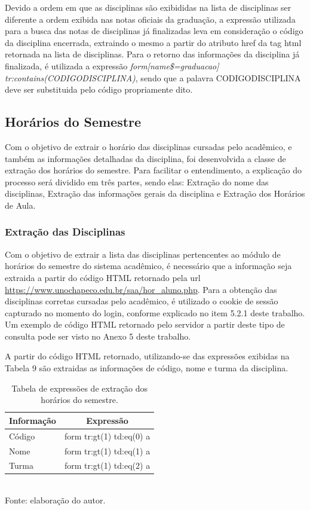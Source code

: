 Devido a ordem em que as disciplinas são exibididas na lista de disciplinas ser diferente a ordem exibida nas notas oficiais da graduação, a expressão utilizada para a busca das notas de disciplinas já finalizadas leva em consideração o código da disciplina encerrada, extraindo o mesmo a partir do atributo href da tag html retornada na lista de disciplinas. Para o retorno das informações da disciplina já finalizada, é utilizada a expressão \emph{form[name\$=graduacao] tr:contains(CODIGODISCIPLINA)}, sendo que a palavra CODIGODISCIPLINA deve ser substituida pelo código propriamente dito.

\subsection{Horários do Semestre}
Com o objetivo de extrair o horário das disciplinas cursadas pelo acadêmico, e também as informações detalhadas da disciplina, foi desenvolvida a classe de extração dos horários do semestre. Para facilitar o entendimento, a explicação do processo será dividido em três partes, sendo elas: Extração do nome das disciplinas, Extração das informações gerais da disciplina e Extração dos Horários de Aula.

\subsubsection{Extração das Disciplinas}
Com o objetivo de extrair a lista das disciplinas pertencentes ao módulo de horários do semestre do sistema acadêmico, é necessário que a informação seja extraida a partir do código HTML retornado pela url \url{https://www.unochapeco.edu.br/saa/hor_aluno.php}. Para a obtenção das disciplinas corretas cursadas pelo acadêmico, é utilizado o cookie de sessão capturado no momento do login, conforme explicado no item 5.2.1 deste trabalho. Um exemplo de código HTML retornado pelo servidor a partir deste tipo de consulta pode ser visto no Anexo 5 deste trabalho.

A partir do código HTML retornado, utilizando-se das expressões exibidas na Tabela 9 são extraidas as informações de código, nome e turma da disciplina.

\begin{table}[!hbt]
\centering
\caption[Extração de Informações - Expressões de Extração Horários do Semestre]{Tabela de expressões de extração dos horários do semestre.}
\vspace{3mm}
\begin{tabular}{p{3cm}|c}\hline
\bf{Informação} & \bf{Expressão}           \\ \hline
Código          & form tr:gt(1) td:eq(0) a \\ \hline
Nome            & form tr:gt(1) td:eq(1) a \\ \hline
Turma           & form tr:gt(1) td:eq(2) a \\ \hline
\end{tabular}
\\ Fonte: elaboração do autor.
\end{table}

